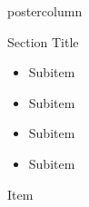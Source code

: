 \documentclass[final,hyperref={pdfpagelabels=false}]{beamer}
\begin{document}
\begin{frame}
\begin{columns}
\begin{column}{.49\textwidth}
\begin{beamercolorbox}[center,wd=\textwidth]{postercolumn}
\begin{minipage}[T]{.95\textwidth}
{\begin{block}{Section Title}
\begin{itemize}
{\begin{itemize}
                    \item Subitem
                    \item Subitem
                    \item Subitem
                    \item Subitem
                  \end{itemize}              
                  \item Item
                }
              \end{itemize}
            \end{block}
          }
        \end{minipage}
      \end{beamercolorbox}
    \end{column}


\end{columns}
\end{frame}
\end{document}
